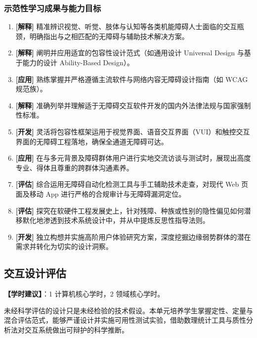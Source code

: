 \subsubsection{示范性学习成果与能力目标}
\begin{enumerate}
    \item \textbf{[解释]} 精准辨识视觉、听觉、肢体与认知等各类机能障碍人士面临的交互瓶颈，明确指出与之相匹配的无障碍与辅助技术解决方案。
    \item \textbf{[解释]} 阐明并应用适宜的包容性设计范式（如通用设计 Universal Design 与基于能力的设计 Ability-Based Design）。
    \item \textbf{[应用]} 熟练掌握并严格遵循主流软件与网络内容无障碍设计指南（如 WCAG 规范族）。
    \item \textbf{[解释]} 准确列举并理解适于无障碍交互软件开发的国内外法律法规与国家强制性标准。
    \item \textbf{[开发]} 灵活将包容性框架运用于视觉界面、语音交互界面（VUI）和触控交互界面的无障碍工程落地，确保全通道无障碍可达。
    \item \textbf{[应用]} 在与多元背景及障碍群体用户进行实地交流访谈与测试时，展现出高度专业、得体且尊重的跨群体沟通素养。
    \item \textbf{[评估]} 综合运用无障碍自动化检测工具与手工辅助技术走查，对现代 Web 页面及移动 App 进行严格的合规审计与无障碍漏洞定位。
    \item \textbf{[评估]} 探究在软硬件工程发展史上，针对残障、种族或性别的隐性偏见如何潜移默化地渗透到技术系统设计中，并从中提炼反思性指导法则。
    \item \textbf{[开发]} 独立构想并实施高阶用户体验研究方案，深度挖掘边缘弱势群体的潜在需求并转化为切实的设计洞察。
\end{enumerate}

\subsection{交互设计评估}
\textbf{【学时建议】}：1 计算机核心学时，2 领域核心学时。

未经科学评估的设计只是未经检验的技术假设。本单元培养学生掌握定性、定量与混合评估范式，能够严谨设计并实施可用性测试实验，借助数理统计工具与质性分析法对交互系统做出可辩护的科学推断。

